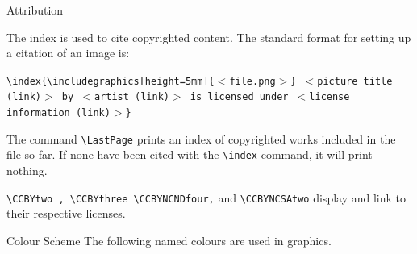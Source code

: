 \documentclass[10pt]{beamer}
\begin{document}
\begin{frame}[t]{Attribution}

The index is used to cite copyrighted content. The standard format for setting up a citation of an image is:


\texttt{\footnotesize\textbackslash index\{\textbackslash includegraphics[height=5mm]\{$<$file.png$>$\} $<$picture title (link)$>$ by $<$artist (link)$>$ is licensed under $<$license information (link)$>$\}
}

\vfill

The command \texttt{\textbackslash LastPage} prints an index of copyrighted works included in the file so far. If none have been cited with the \texttt{\textbackslash index} command, it will print nothing.\vfill

\texttt{\textbackslash  CCBYtwo , \textbackslash CCBYthree \textbackslash  CCBYNCNDfour,} and \texttt{\textbackslash CCBYNCSAtwo} display and link to their respective licenses.
\end{frame}

\begin{frame}{Colour Scheme}
The following named colours are used in graphics. \vfill
{}

\end{frame}
\LastPage
\end{document}
